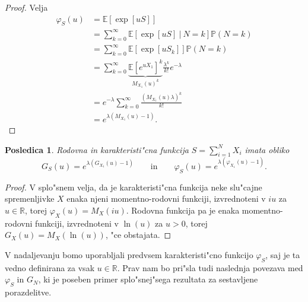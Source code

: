 \documentclass[12pt, a4paper, reqno]{amsart}
\theoremstyle{definition}
\theoremstyle{plain}
\newtheorem{posledica}[definicija]{Posledica}
\newcommand{\R}{\mathbb{R}}
\newcommand{\E}{\mathbb{E}}
\newcommand{\Prob}{\mathbb{P}}
\newcommand{\1}{\mathds{1}}
\begin{document}
    \begin{proof}
        Velja
        \begin{align}
            \varphi_{S}(u) 
                    &= \E\left[\exp\left[uS\right]\right] \nonumber\\
                    &= \sum_{k=0}^{\infty}
                        \E\left[\exp\left[uS\right] \ \big| \ N=k\right]\Prob\left(N = k\right) \nonumber \\ 
                    &= \sum_{k=0}^{\infty}
                        \E\left[\exp\left[uS_k\right]\right]\Prob\left(N = k\right) \nonumber \\
                    &= \sum_{k=0}^{\infty}
                        \underbrace{\E\left[e^{uX_1}\right]^k}_{M_{X_1}(u)^k}\frac{\lambda^k}{k!}e^{-\lambda } \label{eq:MomentS}\\ 
                    &= e^{-\lambda }\sum_{k=0}^\infty\frac{\left(M_{X_1}(u)\lambda \right)^k}{k!} \nonumber \\
                    &= e^{\lambda \left(M_{X_1}(u) - 1\right)}. \nonumber
        \end{align}
    \end{proof}
    
    \begin{posledica}
        Rodovna in karakteristi"cna funkcija $S=\sum_{i = 1}^{N}X_i$ imata obliko 
        \begin{equation*}
            G_{S}(u) = e^{\lambda \left(G_{X_1}(u) - 1\right)} \qquad \text{in} \qquad
            \varphi_{S}(u) = e^{\lambda \left(\varphi_{X_1}(u) - 1\right)}.
        \end{equation*}
        \label{pos:RodovnaKarakteristicna}
    \end{posledica}

    \begin{proof}
    V splo"snem velja, da je karakteristi"cna funkcija neke slu"cajne spremenljivke $X$ enaka
    njeni momentno-rodovni funkciji, izvrednoteni v $iu$ za $u\in\R$, torej $\varphi_X(u) = M_X(iu)$. Rodovna funkcija
    pa je enaka momentno-rodovni funkciji, izvrednoteni v $\ln(u)$ za $u>0$, torej 
    $G_X(u) = M_X\left(\ln(u)\right)$, "ce obstajata.
    \end{proof}

    V nadaljevanju bomo uporabljali predvsem karakteristi"cno funkcijo $\varphi_S$, saj je ta vedno definirana 
    za vsak $u\in\R$. Prav nam bo pri"sla tudi naslednja povezava med $\varphi_S$ in $G_N$, ki je 
    poseben primer splo"snej"sega rezultata za sestavljene porazdelitve.
\end{document}
